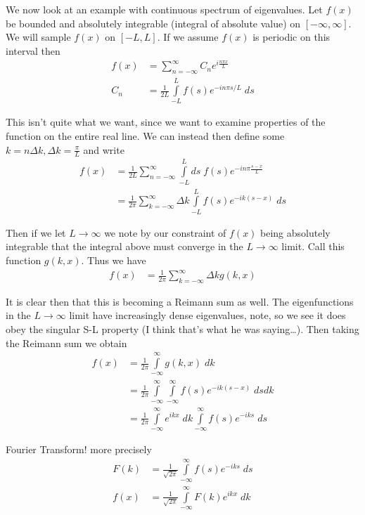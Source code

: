 \documentclass[10pt]{report}
\begin{document}
We now look at an example with continuous spectrum of eigenvalues. Let $f(x)$ be bounded and absolutely integrable (integral of absolute value) on $[-\infty,\infty]$. We will sample $f(x)$ on $[-L,L]$. If we assume $f(x)$ is periodic on this interval then 
\begin{align}
    f(x) &= \sum_{n=-\infty}^{\infty}C_ne^{i\frac{n\pi x}{L}}\\
    C_n &= \frac{1}{2L}\displaystyle\int\limits_{-L}^{L}f(s)e^{-in\pi s/L}\;ds
\end{align}

This isn't quite what we want, since we want to examine properties of the function on the entire real line. We can instead then define some $k = n\Delta k, \Delta k = \frac{\pi}{L}$ and write
\begin{align}
    f(x) &= \frac{1}{2L}\sum_{n=-\infty}^{\infty}\displaystyle\int\limits_{-L}^{L}ds\;f(s)e^{-in\pi\frac{s-x}{L}}\\
    &= \frac{1}{2\pi}\sum_{k = -\infty}^{\infty}\Delta k \displaystyle\int\limits_{-L}^{L}f(s)e^{-ik(s-x)}\;ds
\end{align}

Then if we let $L \to \infty$ we note by our constraint of $f(x)$ being absolutely integrable that the integral above must converge in the $L \to \infty$ limit. Call this function $g(k,x)$. Thus we have
\begin{align}
    f(x) &= \frac{1}{2\pi}\sum_{k=-\infty}^{\infty}\Delta k g(k,x)
\end{align}

It is clear then that this is becoming a Reimann sum as well. The eigenfunctions in the $L \to \infty$ limit have increasingly dense eigenvalues, note, so we see it does obey the singular S-L property (I think that's what he was saying\dots). Then taking the Reimann sum we obtain
\begin{align}
    f(x) &= \frac{1}{2\pi}\displaystyle\int\limits_{-\infty}^{\infty}g(k,x)\;dk\\
    &= \frac{1}{2\pi}\displaystyle\int\limits_{-\infty}^{\infty}\displaystyle\int\limits_{-\infty}^{\infty}f(s)e^{-ik(s-x)}\;dsdk\\
    &= \frac{1}{2\pi}\displaystyle\int\limits_{-\infty}^{\infty}e^{ikx}\;dk\displaystyle\int\limits_{-\infty}^{\infty}f(s)e^{-iks}\;ds
\end{align}

Fourier Transform! more precisely
\begin{align}
    F(k) &= \frac{1}{\sqrt{2\pi}}\displaystyle\int\limits_{-\infty}^{\infty}f(s)e^{-iks}\;ds\\
    f(x) & =\frac{1}{\sqrt{2\pi}}\displaystyle\int\limits_{-\infty}^{\infty}F(k)e^{ikx}\;dk
\end{align}
\end{document}
